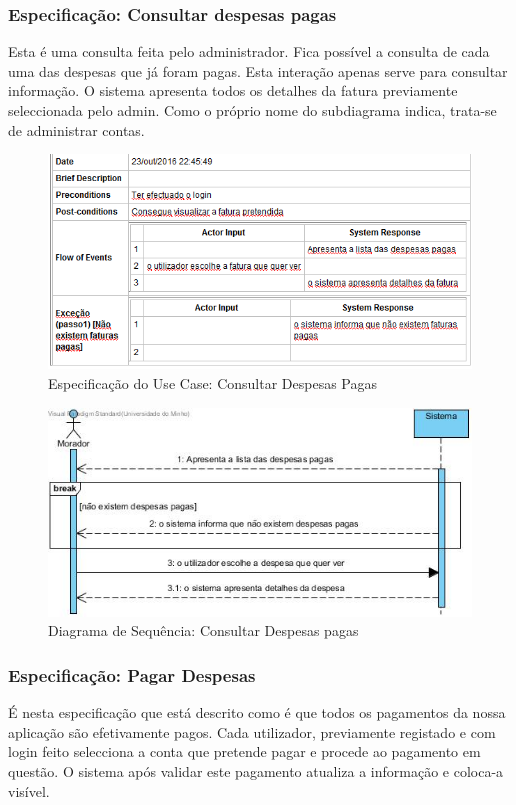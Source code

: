 \subsubsection{Especificação: Consultar despesas pagas }
Esta é uma consulta feita pelo administrador. Fica possível a consulta de cada uma das despesas que já foram pagas. Esta interação apenas serve para consultar informação. O sistema apresenta todos os detalhes da fatura previamente seleccionada pelo admin. 
Como o próprio nome do subdiagrama indica, trata-se de administrar contas. 

\begin{figure}[htb!]
	\centering
	\includegraphics[scale=0.6]{imagens/Especificacoes/consultardespesaspagas}  
	\caption{Especificação do Use Case: Consultar Despesas Pagas}  
\end{figure}

\begin{figure}[htb!]
	\centering
	\includegraphics[scale=0.6]{imagens/DiagramaSeq/ConsultarDespesasPagas}  
	\caption{Diagrama de Sequência: Consultar Despesas pagas }  
\end{figure}


\newpage
\subsubsection{Especificação: Pagar Despesas }
É nesta especificação que está descrito como é que todos os pagamentos da nossa aplicação são efetivamente pagos.
Cada utilizador, previamente registado e com login feito selecciona a conta que pretende pagar e procede ao pagamento em questão. O sistema após validar este pagamento atualiza a informação e coloca-a visível. 

